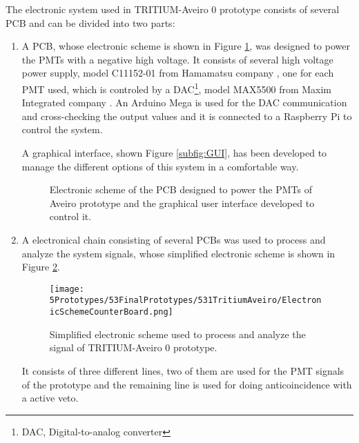 The electronic system used in TRITIUM-Aveiro 0 prototype consists of several PCB and can be divided into two parts:
\begin{enumerate}
\item{} A PCB, whose electronic scheme is shown in Figure \ref{fig:HVElectronicAveiro}, was designed to power the PMTs with a negative high voltage. It consists of several high voltage power supply, model C11152-01 from Hamamatsu company \cite{PowerSupplyAveiroDataSheet}, one for each PMT used, which is controled by a DAC\footnote{DAC, Digital-to-analog converter}, model MAX5500 from Maxim Integrated company \cite{MAX5500DataSheet}. An Arduino Mega is used for the DAC communication and cross-checking the output values and it is connected to a Raspberry Pi to control the system.

A graphical interface, shown Figure \ref{subfig:GUI}, has been developed to manage the different options of this system in a comfortable way.

\begin{figure}[h]
 \centering
 \caption{Electronic scheme of the PCB designed to power the PMTs of Aveiro prototype and the graphical user interface developed to control it.}
 \label{fig:HVElectronicAveiro}
\end{figure}

\item{} A electronical chain consisting of several PCBs was used to process and analyze the system signals, whose simplified electronic scheme is shown in Figure \ref{fig:ElectronicSchemCounterBoard}.

\begin{figure}[h]
\centering
\texttt{[image: 5Prototypes/53FinalPrototypes/531TritiumAveiro/ElectronicSchemeCounterBoard.png]}
\caption{Simplified electronic scheme used to process and analyze the signal of TRITIUM-Aveiro 0 prototype. \label{fig:ElectronicSchemCounterBoard}}
\end{figure}

It consists of three different lines, two of them are used for the PMT signals of the prototype and the remaining line is used for doing anticoincidence with a active veto.


\end{enumerate}
